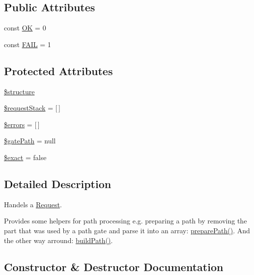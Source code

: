 \subsection*{Public Attributes}
\begin{DoxyCompactItemize}
\item 
const \hyperlink{classWEPPO_1_1Routing_1_1RequestHandler_a2c5d97348177dbc8665d5f4acf76b869}{OK} = 0
\item 
const \hyperlink{classWEPPO_1_1Routing_1_1RequestHandler_a881ac6ebc505c9427b362b99573d3dd3}{F\+A\+IL} = 1
\end{DoxyCompactItemize}
\subsection*{Protected Attributes}
\begin{DoxyCompactItemize}
\item 
\hyperlink{classWEPPO_1_1Routing_1_1RequestHandler_a25956ff2ffa4882e8190dc6593e72b31}{\$structure}
\item 
\hyperlink{classWEPPO_1_1Routing_1_1RequestHandler_accdf8b06b5cca76e8c12d1d45f0f088f}{\$request\+Stack} = \mbox{[}$\,$\mbox{]}
\item 
\hyperlink{classWEPPO_1_1Routing_1_1RequestHandler_a9db9addd7c0509b80a8a252743257f2f}{\$errors} = \mbox{[}$\,$\mbox{]}
\item 
\hyperlink{classWEPPO_1_1Routing_1_1RequestHandler_a2c10ac0592a81286c45fe9b6fdf9dba0}{\$gate\+Path} = null
\item 
\hyperlink{classWEPPO_1_1Routing_1_1RequestHandler_adfc93c985b9e351716670689a05dfed7}{\$exact} = false
\end{DoxyCompactItemize}


\subsection{Detailed Description}
Handels a \hyperlink{classWEPPO_1_1Routing_1_1Request}{Request}.

Provides some helpers for path processing e.\+g. preparing a path by removing the part that was used by a path gate and parse it into an array\+: \hyperlink{classWEPPO_1_1Routing_1_1RequestHandler_a4aebc3b54214e52690684f7db35a3cde}{prepare\+Path()}. And the other way arround\+: \hyperlink{classWEPPO_1_1Routing_1_1RequestHandler_af20adb60caa078da7f1cdd8e47655b03}{build\+Path()}. 

\subsection{Constructor \& Destructor Documentation}
